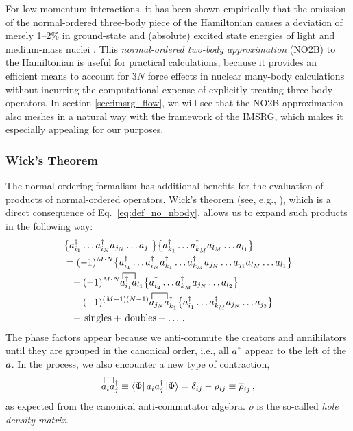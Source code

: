 {For low-momentum interactions, it has been shown empirically that the omission 
of the normal-ordered three-body piece of the Hamiltonian causes a deviation of merely 
1--2\% in ground-state and (absolute) excited state energies of light and medium-mass 
nuclei \cite{Hagen:2007zc,Roth:2011kx,Roth:2012qf,Binder:2013fk,Gebrerufael:2016fe}. 
This \emph{normal-ordered two-body approximation} (NO2B) to the Hamiltonian is
useful for practical calculations, because it provides an efficient means to 
account for $3N$ force effects in nuclear many-body calculations without incurring 
the computational expense of explicitly treating three-body operators. In section 
\ref{sec:imsrg_flow}, we will see that the NO2B approximation also meshes in a natural 
way with the framework of the IMSRG, which makes it especially appealing for our 
purposes.

%
%
\subsubsection{Wick's Theorem}
The normal-ordering formalism has additional benefits for the evaluation
of products of normal-ordered operators. Wick's theorem (see, e.g., \cite{Shavitt:2009}), 
which is a direct consequence of Eq.~\eqref{eq:def_no_nbody}, allows us to 
expand such products in the following way:
\begin{align}\label{eq:def_wick}
   & \nord{\aaO_{i_1}\ldots\aaO_{i_N}\aO_{j_{N}}\ldots\aO_{j_{1}}} 
     \nord{\aaO_{k_1}\ldots\aaO_{k_M}\aO_{l_{M}}\ldots\aO_{l_{1}}}
   \notag\\
    &=(-1)^{M\cdot N}  
     \nord{\aaO_{i_1}\ldots\aaO_{i_N}\aaO_{k_1}\ldots\aaO_{k_M}\aO_{j_{N}}\ldots\aO_{j_{1}}\aO_{l_{M}}\ldots\aO_{l_{1}}} 
    \notag\\
    &\hphantom{=}
       + (-1)^{M\cdot N}\contraction[1.5ex]{}{\aO}{{}^\dag_{i_1}}{\aO}\aaO_{i_1}\aO_{l_1} 
        \nord{\aaO_{i_2}\ldots\aaO_{k_M}\aO_{j_{N}}\ldots\aO_{l_{2}}} \notag\\
    &\hphantom{\equiv}
      + (-1)^{(M-1)(N-1)}\contraction[1.5ex]{}{\aO}{{}^\dag_{j_N}}{\aO}\aO_{j_N}\aaO_{k_1} 
        \nord{\aaO_{i_1}\ldots\aaO_{k_M}\aO_{j_{N}}\ldots\aO_{j_2}}
      \notag\\
    &\hphantom{=}
      + \text{\,singles}+ \text{\,doubles} + \ldots \,.
\end{align}
The phase factors appear because we anti-commute the creators and 
annihilators until they are grouped in the canonical order, i.e.,
all $a^\dag$ appear to the left of the $a$. In the process, we also 
encounter a new type of contraction,
\begin{equation}\label{eq:def_hole_contraction}
  \contraction[1.5ex]{}{\aO}{{}^\dag_{i}}{\aO}\aO_{i}\aaO_{j} 
  \equiv \matrixe{\Phi}{\aO_{i}\aaO_{j}}{\Phi}
  = \delta_{ij} - \rho_{ij} \equiv \overline{\rho}_{ij}\,,
\end{equation}
as expected from the canonical anti-commutator algebra. $\overline\rho$
is the so-called \emph{hole density matrix}. 

}

